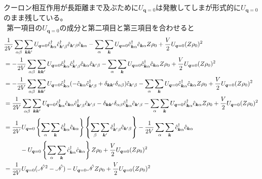 \documentclass[dvipdfmx, 11pt, a4paper]{jsarticle}
\theoremstyle{definition}
\numberwithin{equation}{section}
\begin{document}
    クーロン相互作用が長距離まで及ぶために$U_{\bm{q}=0}$は発散してしまが形式的に$U_{\bm{q}=0}$のまま残している。\\
    $\ \ $第一項目の$U_{\bm{q}=0}$の成分と第二項目と第三項目を合わせると
    \begin{align}
        &\frac{1}{2V}\sum_{\alpha \beta}\sum_{\bm{k}\bm{k}'} U_{\bm{q}=0} \hat{c}^\dagger_{\bm{k}\alpha} \hat{c}^\dagger_{\bm{k}' \beta} \hat{c}_{\bm{k}'\beta} \hat{c}_{\bm{k}\alpha}-\sum_{\alpha}\sum_{\bm{k}} U_{\bm{q}=0}\hat{c}^\dagger_{\bm{k}\alpha}\hat{c}_{\bm{k}\alpha}Z\rho_0 + \frac{V}{2}U_{\bm{q}=0}(Z\rho_0)^2 \notag \\
        &=-\frac{1}{2V}\sum_{\alpha \beta}\sum_{\bm{k}\bm{k}'} U_{\bm{q}=0} \hat{c}^\dagger_{\bm{k}\alpha} \hat{c}^\dagger_{\bm{k}' \beta} \hat{c}_{\bm{k}\alpha}\hat{c}_{\bm{k}'\beta} -\sum_{\alpha}\sum_{\bm{k}} U_{\bm{q}=0}\hat{c}^\dagger_{\bm{k}\alpha}\hat{c}_{\bm{k}\alpha}Z\rho_0 + \frac{V}{2}U_{\bm{q}=0}(Z\rho_0)^2 \notag \\
        &=-\frac{1}{2V}\sum_{\alpha \beta}\sum_{\bm{k}\bm{k}'} U_{\bm{q}=0} \hat{c}^\dagger_{\bm{k}\alpha}( -\hat{c}_{\bm{k}\alpha}\hat{c}^\dagger_{\bm{k}' \beta} + \delta_{\bm{k}\bm{k}'} \delta_{\alpha \beta} )\hat{c}_{\bm{k}'\beta} -\sum_{\alpha}\sum_{\bm{k}} U_{\bm{q}=0}\hat{c}^\dagger_{\bm{k}\alpha}\hat{c}_{\bm{k}\alpha}Z\rho_0 + \frac{V}{2}U_{\bm{q}=0}(Z\rho_0)^2 \notag \\
        &=\frac{1}{2V}\sum_{\alpha \beta}\sum_{\bm{k}\bm{k}'} U_{\bm{q}=0} \hat{c}^\dagger_{\bm{k}\alpha}\hat{c}_{\bm{k}\alpha}\hat{c}^\dagger_{\bm{k}' \beta}\hat{c}_{\bm{k}'\beta} - \delta_{\bm{k}\bm{k}'} \delta_{\alpha \beta} \hat{c}^\dagger_{\bm{k}\alpha}\hat{c}_{\bm{k}'\beta} -\sum_{\alpha}\sum_{\bm{k}} U_{\bm{q}=0}\hat{c}^\dagger_{\bm{k}\alpha}\hat{c}_{\bm{k}\alpha}Z\rho_0 + \frac{V}{2}U_{\bm{q}=0}(Z\rho_0)^2 \notag \\
        &=\frac{1}{2V} U_{\bm{q}=0} \left\{ \sum_\alpha \sum_{\bm{k}} \hat{c}^\dagger_{\bm{k}\alpha}\hat{c}_{\bm{k}\alpha} \right\}\left\{ \sum_\beta \sum_{\bm{k}'} \hat{c}^\dagger_{\bm{k}'\beta}\hat{c}_{\bm{k}'\beta} \right\} - \frac{1}{2V} \sum_\alpha \sum_{\bm{k}} \hat{c}^\dagger_{\bm{k}\alpha}\hat{c}_{\bm{k}\alpha} \notag \\
        &\ \ \ \ \ \ \ \ -U_{\bm{q}=0}\left\{ \sum_{\alpha}\sum_{\bm{k}} \hat{c}^\dagger_{\bm{k}\alpha}\hat{c}_{\bm{k}\alpha} \right\}Z\rho_0 + \frac{V}{2}U_{\bm{q}=0}(Z\rho_0)^2 \notag  \\
        &=\frac{1}{2V} U_{\bm{q}=0} (\hat{\mathscr{N}}^2-\hat{\mathscr{N}}) - U_{\bm{q}=0}\hat{\mathscr{N}}Z\rho_0 + \frac{V}{2}U_{\bm{q}=0}(Z\rho_0)^2  
    \end{align}
\end{document}
